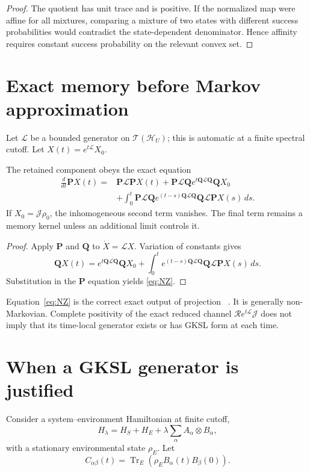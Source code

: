 \documentclass[11pt]{article}
\DeclareMathOperator{\Tr}{Tr}
\newcommand{\T}{\mathcal T}
\newcommand{\cH}{\mathcal H}
\newcommand{\cL}{\mathcal L}
\newcommand{\cP}{\mathbf P}
\newcommand{\cQ}{\mathbf Q}
\newcommand{\R}{\mathcal R}
\newcommand{\J}{\mathcal J}
\begin{document}
\begin{proof}
The quotient has unit trace and is positive. If the normalized map were affine for
all mixtures, comparing a mixture of two states with different success probabilities
would contradict the state-dependent denominator. Hence affinity requires constant
success probability on the relevant convex set.
\end{proof}

\section{Exact memory before Markov approximation}

Let $\cL$ be a bounded generator on $\T(\cH_U)$; this is automatic at a finite
spectral cutoff. Let $X(t)=e^{t\cL}X_0$.

\begin{theorem}\label{thm:NZ}
The retained component obeys the exact equation
\begin{align}
\frac{d}{dt}\cP X(t)
={}&\cP\cL\cP X(t)
+\cP\cL\cQ e^{t\cQ\cL\cQ}\cQ X_0 \nonumber\\
&+\int_0^t
\cP\cL\cQ e^{(t-s)\cQ\cL\cQ}
\cQ\cL\cP X(s)\,ds .
\label{eq:NZ}
\end{align}
If $X_0=\J\rho_0$, the inhomogeneous second term vanishes. The final term remains
a memory kernel unless an additional limit controls it.
\end{theorem}

\begin{proof}
Apply $\cP$ and $\cQ$ to $\dot X=\cL X$. Variation of constants gives
\[
\cQ X(t)=e^{t\cQ\cL\cQ}\cQ X_0+
\int_0^t e^{(t-s)\cQ\cL\cQ}\cQ\cL\cP X(s)\,ds.
\]
Substitution in the $\cP$ equation yields \eqref{eq:NZ}.
\end{proof}

Equation~\eqref{eq:NZ} is the correct exact output of projection
~\cite{Nakajima1958,Zwanzig1960}. It is generally
non-Markovian. Complete positivity of the exact reduced channel
$\R e^{t\cL}\J$ does not imply that its time-local generator exists or has GKSL
form at each time.

\section{When a GKSL generator is justified}

Consider a system--environment Hamiltonian at finite cutoff,
\[
 H_\lambda=H_S+H_E+\lambda\sum_\alpha A_\alpha\otimes B_\alpha,
\]
with a stationary environmental state $\rho_E$. Let
\[
 C_{\alpha\beta}(t)=
\Tr_E\!\left(\rho_E B_\alpha(t)B_\beta(0)\right).
\]
\end{document}
